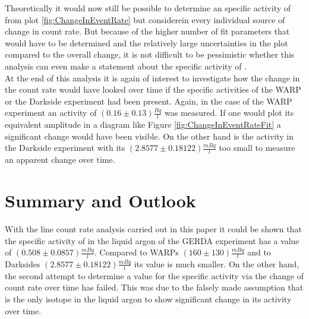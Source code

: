 Theoretically it would now still be possible to determine an specific activity of \Kr from plot \ref{fig:ChangeInEventRate} but considerein every individual source of change in count rate.
But because of the higher number of fit parameters that would have to be determined and the relatively large uncertainties in the plot compared to the overall change, it is not difficult to be pessimistic whether this analysis can even make a statement about the specific activity of \Kr.
\\

At the end of this analysis it is again of interest to investigate how the change in the count rate would have looked over time if the specific activities of the WARP or the Darkside experiment had been present.
Again, in the case of the WARP experiment an activity of $(0.16\pm0.13)\frac{\unit{Bq}}{\unit{l}}$ was measured. 
If one would plot its equivalent amplitude in a diagram like Figure \ref{fig:ChangeInEventRateFit} a significant change would have been visible.
On the other hand is the activity in the Darkside experiment with its $(2.8577 \pm 0.18122) \frac{\unit{mBq}}{\unit{l}}$ too small to measure an apparent change over time.
\\



\chapter{Summary and Outlook}
\label{sec:ConcAndOutlook}

With the line count rate analysis carried out in this paper it could be shown that the specific activity of  in the liquid argon of the GERDA experiment has a value of $(0.508\pm0.0857) \frac{\unit{mBq}}{\unit{l}}$. 
Compared to WARPs $(160\pm130)\frac{\unit{mBq}}{\unit{l}}$ and to Darksides $(2.8577 \pm 0.18122) \frac{\unit{mBq}}{\unit{l}}$ its value is much smaller.
On the other hand, the second attempt to determine a value for the specific activity via the change of count rate over time has failed.
This was due to the falsely made assumption that \Kr is the only isotope in the liquid argon to show significant change in its activity over time.
\\


\backmatter



